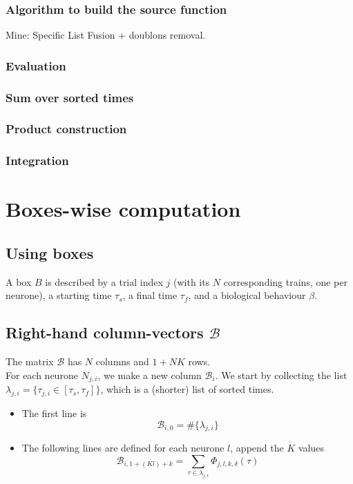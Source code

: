 \documentclass{revtex4}
\begin{document}
\subsubsection{Algorithm to build the source function}
Mine: Specific List Fusion + doublons removal.

\subsubsection{Evaluation}

\subsubsection{Sum over sorted times}

\subsubsection{Product construction}

\subsubsection{Integration}


\section{Boxes-wise computation}
\subsection{Using boxes}
A box $B$ is described by a trial index $j$ (with its $N$ corresponding trains, one per neurone),
a starting time $\tau_{s}$, a final time $\tau_{f}$, and a biological behaviour $\beta$.

\subsection{Right-hand column-vectors $\mathcal{B}$}
The matrix $\mathcal{B}$ has $N$ columns and $1+NK$ rows.\\
For each neurone $N_{j,i}$, we make a new column $\mathcal{B}_i$.
We start by collecting the list $\lambda_{j,i}=\lbrace\tau_{j,i}\in\left[\tau_s,\tau_f\right]\rbrace$,
which is a (shorter) list of sorted times.
\begin{itemize}
\item
The first line is
$$
	\mathcal{B}_{i,0} = \#\lbrace\lambda_{j,i}\rbrace
$$
\item
The following lines are defined for each neurone $l$, append the $K$ values
$$
	\mathcal{B}_{i,1+(Kl)+k} = \sum_{\tau\in\lambda_{j,i}} \Phi_{j,l,k,\delta}(\tau)
$$
\end{itemize}
\end{document}
